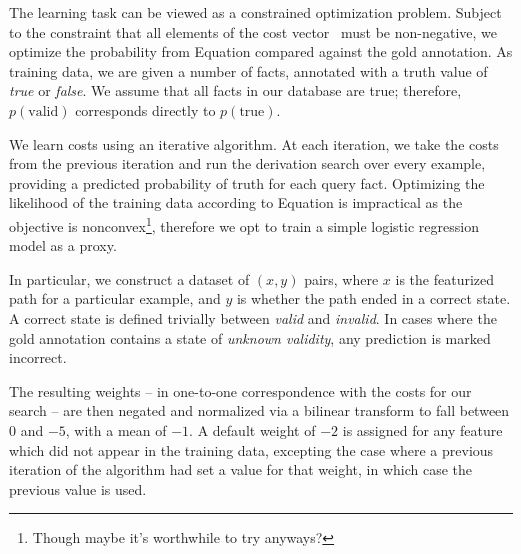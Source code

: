 The learning task can be viewed as a constrained optimization problem.
Subject to the constraint that all elements of the cost vector \btheta\ 
  must be non-negative, we optimize the probability from
  Equation  compared against the gold annotation.
As training data, we are given a number of facts, annotated with a
  truth value of \textit{true} or \textit{false}.
We assume that all facts in our database are true; therefore,
  $p(\textrm{valid})$ corresponds directly to $p(\textrm{true})$.

We learn costs using an iterative algorithm.
At each iteration, we take the costs from the previous iteration
  and run the derivation search over every example, providing
  a predicted probability of truth for each query fact.
Optimizing the likelihood of the training data according to
  Equation  is impractical as the objective is nonconvex\footnote{
    Though maybe it's worthwhile to try anyways?
  }, therefore we opt to train a simple logistic regression model
  as a proxy.

In particular, we construct a dataset of $(x,y)$ pairs, where $x$ is the
  featurized path for a particular example, and $y$ is whether the
  path ended in a correct state.
A correct state is defined trivially between \textit{valid} and
  \textit{invalid}.
In cases where the gold annotation contains a state of 
  \textit{unknown validity}, any prediction is marked incorrect.

The resulting weights -- in one-to-one correspondence with the costs
  for our search -- are then negated and normalized via a bilinear
  transform to fall between 0 and $-5$, with a mean of $-1$.
A default weight of $-2$ is assigned for any feature which did not
  appear in the training data, excepting the case where a previous
  iteration of the algorithm had set a value for that weight, in
  which case the previous value is used.
